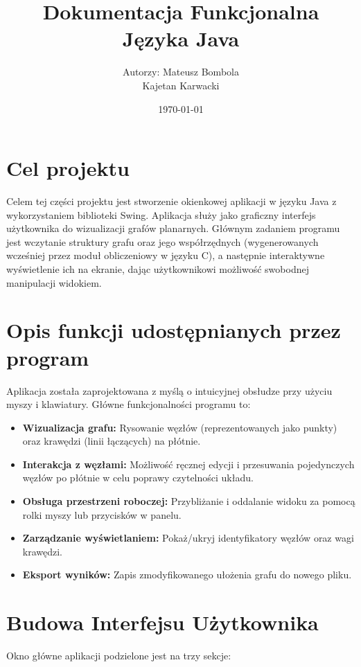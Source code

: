 \documentclass[12pt, a4paper]{article}
\title{\vspace*{3cm} \textbf{Dokumentacja Funkcjonalna Języka Java}}
\author{Autorzy: Mateusz Bombola \\ Kajetan Karwacki}
\date{\today}
\begin{document}
\maketitle
\thispagestyle{empty}

\newpage
\tableofcontents
\newpage

\section{Cel projektu}
Celem tej części projektu jest stworzenie okienkowej aplikacji w języku Java z wykorzystaniem biblioteki Swing. Aplikacja służy jako graficzny interfejs użytkownika do wizualizacji grafów planarnych. Głównym zadaniem programu jest wczytanie struktury grafu oraz jego współrzędnych (wygenerowanych wcześniej przez moduł obliczeniowy w języku C), a następnie interaktywne wyświetlenie ich na ekranie, dając użytkownikowi możliwość swobodnej manipulacji widokiem.

\section{Opis funkcji udostępnianych przez program}
Aplikacja została zaprojektowana z myślą o intuicyjnej obsłudze przy użyciu myszy i klawiatury. Główne funkcjonalności programu to:
\begin{itemize}
    \item \textbf{Wizualizacja grafu:} Rysowanie węzłów (reprezentowanych jako punkty) oraz krawędzi (linii łączących) na płótnie.
    \item \textbf{Interakcja z węzłami:} Możliwość ręcznej edycji i przesuwania pojedynczych węzłów po płótnie w celu poprawy czytelności układu.
    \item \textbf{Obsługa przestrzeni roboczej:} Przybliżanie i oddalanie widoku za pomocą rolki myszy lub przycisków w panelu.
    \item \textbf{Zarządzanie wyświetlaniem:} Pokaż/ukryj identyfikatory węzłów oraz wagi krawędzi.
    \item \textbf{Eksport wyników:} Zapis zmodyfikowanego ułożenia grafu do nowego pliku.
\end{itemize}

\section{Budowa Interfejsu Użytkownika}
Okno główne aplikacji podzielone jest na trzy sekcje:
\end{document}
